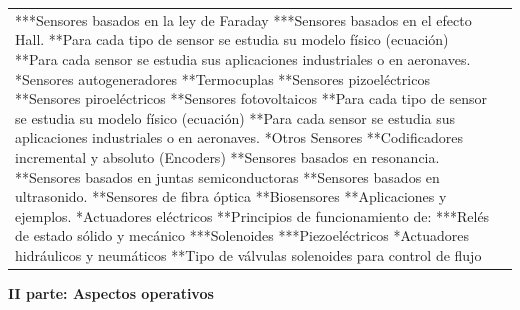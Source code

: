 \documentclass[letterpaper]{article}%
\begin{document}
\begin{longtable}{p{}p{}}
\newline%
***Sensores basados en la ley de Faraday
\newline%
***Sensores basados en el efecto Hall.
\newline%
**Para cada tipo de sensor se estudia su modelo físico (ecuación)
\newline%
**Para cada sensor se estudia sus aplicaciones industriales o en aeronaves.
\newline%
*Sensores autogeneradores
\newline%
**Termocuplas
\newline%
**Sensores pizoeléctricos
\newline%
**Sensores piroeléctricos
\newline%
**Sensores fotovoltaicos
\newline%
**Para cada tipo de sensor se estudia su modelo físico (ecuación)
\newline%
**Para cada sensor se estudia sus aplicaciones industriales o en aeronaves.
\newline%
*Otros Sensores 
\newline%
**Codificadores incremental y absoluto (Encoders)
\newline%
**Sensores basados en resonancia.
\newline%
**Sensores basados en juntas semiconductoras
\newline%
**Sensores basados en ultrasonido.
\newline%
**Sensores de fibra óptica
\newline%
**Biosensores
\newline%
**Aplicaciones y ejemplos.
\newline%
*Actuadores eléctricos 
\newline%
**Principios de funcionamiento de:
\newline%
***Relés de estado sólido y mecánico
\newline%
***Solenoides
\newline%
***Piezoeléctricos
\newline%
*Actuadores hidráulicos y neumáticos
\newline%
**Tipo de válvulas solenoides para control de flujo\\%
\end{longtable}%
\par\fontsize{14}{0}\selectfont \textbf{\textcolor{parte}{II parte: Aspectos operativos}}%
\end{document}
